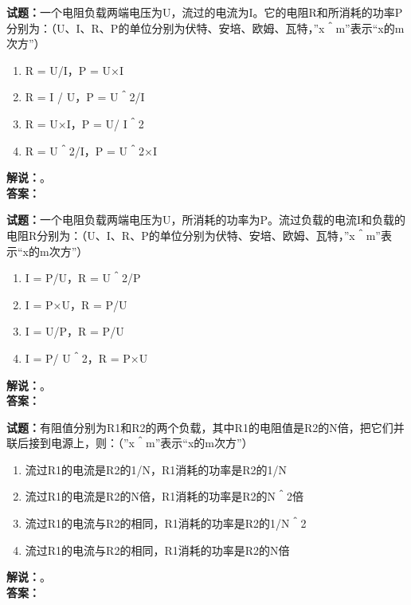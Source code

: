 \documentclass{ctexbook}
\begin{document}
\vspace{\baselineskip}

\noindent\textbf{试题：}一个电阻负载两端电压为U，流过的电流为I。它的电阻R和所消耗的功率P分别为：（U、I、R、P的单位分别为伏特、安培、欧姆、瓦特，”x＾m”表示“x的m次方”）
\begin{enumerate}[leftmargin=3em]
  \item R = U/I，P = U×I
  \item R = I / U，P = U＾2/I
  \item R = U×I，P = U/ I＾2
  \item R = U＾2/I，P = U＾2×I
\end{enumerate}
\noindent\textbf{解说：}\textbf{}。\\\noindent\textbf{答案：}

\vspace{\baselineskip}

\noindent\textbf{试题：}一个电阻负载两端电压为U，所消耗的功率为P。流过负载的电流I和负载的电阻R分别为：（U、I、R、P的单位分别为伏特、安培、欧姆、瓦特，”x＾m”表示“x的m次方”）
\begin{enumerate}[leftmargin=3em]
  \item I = P/U，R = U＾2/P
  \item I = P×U，R = P/U
  \item I = U/P，R = P/U
  \item I = P/ U＾2，R = P×U
\end{enumerate}
\noindent\textbf{解说：}\textbf{}。\\\noindent\textbf{答案：}

\vspace{\baselineskip}

\noindent\textbf{试题：}有阻值分别为R1和R2的两个负载，其中R1的电阻值是R2的N倍，把它们并联后接到电源上，则：（”x＾m”表示“x的m次方”）
\begin{enumerate}[leftmargin=3em]
  \item 流过R1的电流是R2的1/N，R1消耗的功率是R2的1/N
  \item 流过R1的电流是R2的N倍，R1消耗的功率是R2的N＾2倍
  \item 流过R1的电流与R2的相同，R1消耗的功率是R2的1/N＾2
  \item 流过R1的电流与R2的相同，R1消耗的功率是R2的N倍
\end{enumerate}
\noindent\textbf{解说：}\textbf{}。\\\noindent\textbf{答案：}

\vspace{\baselineskip}
\end{document}
